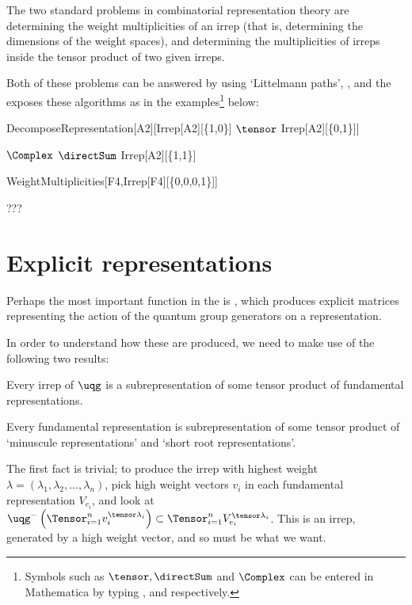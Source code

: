 The two standard problems in combinatorial representation theory are
determining the weight multiplicities of an irrep (that is, determining
the dimensions of the weight spaces), and determining the multiplicities
of irreps inside the tensor product of two given irreps.

Both of these problems can be answered by using `Littelmann paths',
\cite{???}, and the \pkg exposes these algorithms
as in the examples\footnote{Symbols such as $\tensor, \directSum$ and
$\Complex$ can be entered in Mathematica by typing ,
 and  respectively.} below:
\begin{mma}
\begin{inm}
DecomposeRepresentation[A2][Irrep[A2][\{1,0\}] $\tensor$
Irrep[A2][\{0,1\}]]
\end{inm}
\begin{outm}
$\Complex$ $\directSum$ Irrep[A2][\{1,1\}]
\end{outm}
\begin{inm}
WeightMultiplicities[F4,Irrep[F4][\{0,0,0,1\}]]
\end{inm}
\begin{outm}
???
\end{outm}
\end{mma}

\section{Explicit representations}
Perhaps the most important function in the \pkg is
, which produces explicit matrices representing
the action of the quantum group generators on a representation.

In order to understand how these are produced, we need to make use of the
following two results:

\begin{fact}
\label{fact:fundamental}
Every irrep of $\uqg$ is a subrepresentation of some tensor product
of fundamental representations.
\end{fact}

\begin{fact}
\label{fact:generators}
Every fundamental representation is subrepresentation of some
tensor product of `minuscule representations' and `short root
representations'.
\end{fact}

The first fact is trivial; to produce the irrep with highest weight
$\lambda = (\lambda_1, \lambda_2, \ldots, \lambda_n)$, pick high weight
vectors $v_i$ in each fundamental representation $V_{e_i}$, and look at
$\uqg^-\left(\Tensor_{i=1}^n  v_i^{\tensor \lambda_i}\right) \subset
\Tensor_{i=1}^n  V_{e_i}^{\tensor \lambda_i}$. This is an irrep,
generated by a high weight vector, and so must be what we want.

